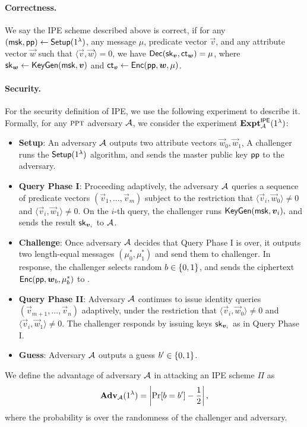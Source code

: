 \paragraph{Correctness.} We say the IPE scheme described above is correct, if for any $(\mathsf{msk}, \mathsf{pp}) \leftarrow \mathsf{Setup}(1^\lambda)$, any message $\mu$, predicate vector $\vec{v}$, and any attribute vector $\vec{w}$ such that $\langle \vec{v}, \vec{w}\rangle = 0$, we have $\mathsf{Dec}(\mathsf{sk}_{\boldsymbol{v}}, \mathsf{ct}_{\boldsymbol{w}}) = \mu$, where $\mathsf{sk}_{\boldsymbol{w}} \leftarrow \mathsf{KeyGen}(\mathsf{msk}, \boldsymbol{v})$ and $\mathsf{ct}_{\boldsymbol{v}} \leftarrow \mathsf{Enc}(\mathsf{pp}, \boldsymbol{w}, \mu)$.

\paragraph{Security.}For the security definition of IPE, we use the following experiment to describe it. Formally, for any $\textsc{ppt}$ adversary $\mathcal{A}$, we consider the experiment $\mathbf{Expt}_{\mathcal{A}}^{\mathsf{IPE}}(1^\lambda)$:
\begin{itemize}
 \item \textbf{Setup}: An adversary $\mathcal{A}$ outputs two attribute vectors $\vec{w}_{0}, \vec{w}_{1}$,  A challenger runs the $\mathsf{Setup}(1^\lambda)$ algorithm, and sends the master public key $\mathsf{pp}$ to the adversary.
 \item \textbf{Query Phase I}: Proceeding adaptively, the adversary $\mathcal{A}$ queries a sequence of predicate vectors $(\vec{v}_1,..., \vec{v}_m)$ subject to the restriction that $\langle \vec{v}_i, \vec{w}_{0} \rangle \neq 0$ and $\langle \vec{v}_i, \vec{w}_{1} \rangle \neq 0$. On the $i$-th query, the challenger runs $\mathsf{KeyGen}(\mathsf{msk}, \boldsymbol{v}_i),$ and sends the result $\mathsf{sk}_{\boldsymbol{v}_i}$ to $\mathcal{A}$.
 \item \textbf{Challenge}: Once adversary $\mathcal{A}$ decides that Query Phase I is over, it outputs  two length-equal messages $(\mu^*_0, \mu^*_1)$ and send them to challenger.  In response, the challenger selects random $b \in \{0,1\}$, and sends the ciphertext $\mathsf{Enc}(\mathsf{pp}, \boldsymbol{w}_{b}, \mu^*_b)$ to \A.
 \item \textbf{Query Phase II}: Adversary $\mathcal{A}$ continues to issue identity queries $(\vec{v}_{m + 1},..., \vec{v}_{n})$ adaptively, under the restriction that $\langle \vec{v}_i, \vec{w}_{0} \rangle \neq 0$ and $\langle \vec{v}_i, \vec{w}_{1} \rangle \neq 0$. The challenger responds by issuing keys $\mathsf{sk}_{\boldsymbol{v}_i}$ as in Query Phase I.
 \item \textbf{Guess}: Adversary $\mathcal{A}$ outputs a guess $b' \in \{0,1\}$.
\end{itemize}
We define the advantage of adversary $\mathcal{A}$ in attacking an IPE scheme $\Pi$ as
$$\mathbf{Adv}_{\mathcal{A}}(1^\lambda) = \left|\Pr[b = b'] - \frac{1}{2}\right|,$$
\noindent where the probability is over the randomness of the challenger and adversary.

